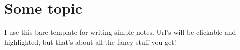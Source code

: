 \documentclass[a4paper,12pt,dvipsnames]{article}
\begin{document}
\section*{Some topic}
  I use this bare template for writing simple notes. Url's will be clickable and highlighted, but that's about all the fancy stuff you get!
\end{document}
